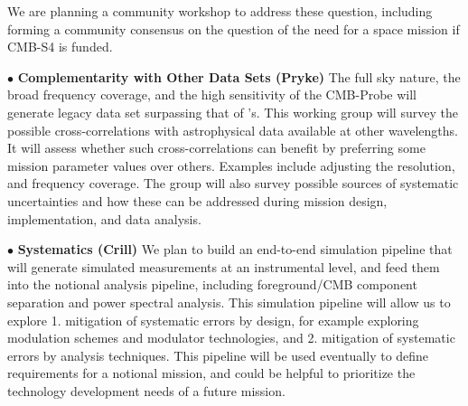We are planning a community workshop to address these question, including forming a community consensus on the 
question of the need for a space mission if CMB-S4 is funded. 

$\bullet$ {\bf Complementarity with Other Data Sets (Pryke)} \hspace{0.1in}
The full sky nature, the broad frequency coverage, and the high sensitivity of the CMB-Probe will generate legacy 
data set surpassing that of \planck 's. This working group will survey the possible cross-correlations with astrophysical 
data available at other wavelengths. It will assess whether such cross-correlations can benefit by preferring 
some mission parameter values over others. Examples include adjusting the resolution, and frequency coverage. 
The group will also survey possible sources of systematic uncertainties and how these can be addressed during mission 
design, implementation, and data analysis. 

$\bullet$ {\bf Systematics (Crill)} \hspace{0.1in} We plan to build an end-to-end simulation pipeline that will 
generate simulated measurements at an instrumental level, and feed them into the notional analysis pipeline, 
including foreground/CMB component separation and power spectral analysis.  This simulation pipeline 
will allow us to explore 1. mitigation of systematic errors by design, for example exploring modulation 
schemes and modulator technologies, and 2. mitigation of systematic errors by analysis techniques.  
This pipeline will be used eventually to define requirements for a notional mission, and could be helpful to 
prioritize the technology development needs of a future mission. 



